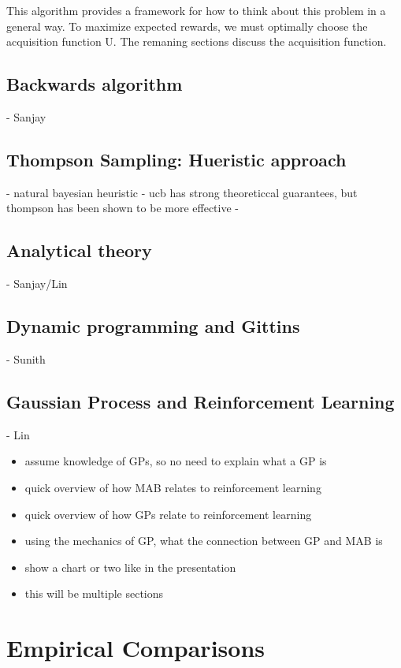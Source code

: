\documentclass{article}
\begin{document}
This algorithm provides a framework for how to think about this problem in a general way. To maximize expected rewards, we must optimally choose the acquisition function U. The remaning sections discuss the acquisition function.

\subsection{Backwards algorithm}

- Sanjay

\subsection{Thompson Sampling: Hueristic approach}

- natural bayesian heuristic
- ucb has strong theoreticcal guarantees, but thompson has been shown to be more effective
- 

\subsection{Analytical theory}

- Sanjay/Lin

\subsection{Dynamic programming and Gittins}

- Sunith

\subsection{Gaussian Process and Reinforcement Learning}

- Lin
\begin{itemize}
\item assume knowledge of GPs, so no need to explain what a GP is
\item quick overview of how MAB relates to reinforcement learning
\item quick overview of how GPs relate to reinforcement learning
\item using the mechanics of GP, what the connection between GP and MAB is
\item show a chart or two like in the presentation
\item this will be multiple sections
\end{itemize}

\section{Empirical Comparisons}
\end{document}

